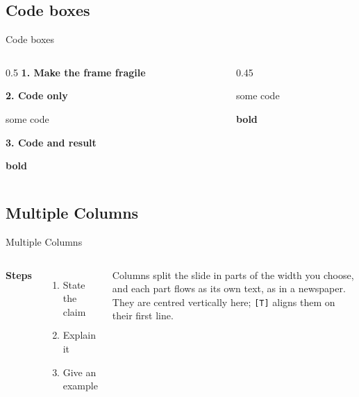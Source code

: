 \documentclass[aspectratio=1610,xcolor=dvipsnames]{beamer}
\begin{document}

\subsection{Code boxes}
\begin{frame}[fragile]{Code boxes}
\begin{columns}[T,onlytextwidth]
\begin{column}{0.5\textwidth}
\textbf{1. Make the frame fragile}\par\smallskip
{}

\subsection{Multiple Columns}
\begin{frame}{Multiple Columns}
    \begin{columns}[c]
        \textbf{Steps}
        \begin{enumerate}
            \item State the claim
            \item Explain it
            \item Give an example
        \end{enumerate}

        Columns split the slide in parts of the width you choose, and each part flows as its own text, as in a newspaper. They are centred vertically here; \texttt{[T]} aligns them on their first line.
    \end{columns}
\end{frame}
\end{document}
